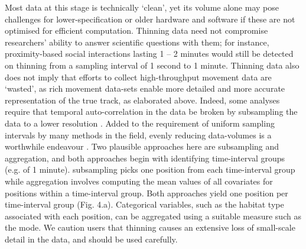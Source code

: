 \documentclass[10pt,paper=a4,headings=standardclasses
]{scrartcl}
\begin{document}
Most data at this stage is technically ‘clean’, yet its volume alone may pose challenges for lower-specification or older hardware and software if these are not optimised for efficient computation.
Thinning data need not compromise researchers' ability to answer scientific questions with them; for instance, proximity-based social interactions lasting 1 -- 2 minutes would still be detected on thinning from a sampling interval of 1 second to 1 minute. Thinning data also does not imply that efforts to collect high-throughput movement data are ‘wasted’, as rich movement data-sets enable more detailed and more accurate representation of the true track, as elaborated above. 
Indeed, some analyses require that temporal auto-correlation in the data be broken by subsampling the data to a lower resolution \citep[such as the estimation of home-ranges or step-selection functions;][]{fleming2014a, dupke2017}.
Added to the requirement of uniform sampling intervals by many methods in the field, evenly reducing data-volumes is a worthwhile endeavour \citep[e.g.][]{fleming2014a, michelot2016, avgar2016}.
Two plausible approaches here are subsampling and aggregation, and both approaches begin with identifying time-interval groups (e.g. of 1 minute).
subsampling picks one position from each time-interval group while aggregation involves computing the mean values of all covariates for positions within a time-interval group.
Both approaches yield one position per time-interval group (Fig. 4.a).
Categorical variables, such as the habitat type associated with each position, can be aggregated using a suitable measure such as the mode.
We caution users that thinning causes an extensive loss of small-scale detail in the data, and should be used carefully.
\end{document}
